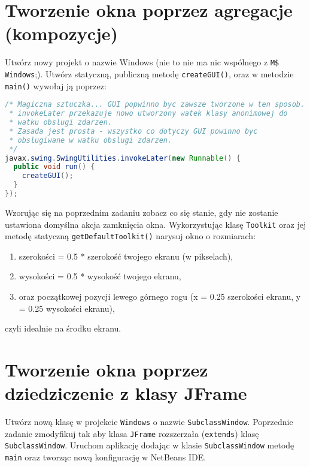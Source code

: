 \documentclass[12pt,letterpaper]{article}
\begin{document}
\section{Tworzenie okna poprzez agregacje (kompozycje)}
\label{sec:tworz-okna-agreg}

Utwórz nowy projekt o nazwie Windows (nie to nie ma nic wspólnego z \verb+M$ Windows+;).
Utwórz statyczną, publiczną metodę \verb+createGUI()+, oraz w metodzie \verb+main()+
wywołaj ją poprzez:
\begin{lstlisting}[language=Java]
/* Magiczna sztuczka... GUI popwinno byc zawsze tworzone w ten sposob.
 * invokeLater przekazuje nowo utworzony watek klasy anonimowej do 
 * watku obslugi zdarzen. 
 * Zasada jest prosta - wszystko co dotyczy GUI powinno byc
 * obslugiwane w watku obslugi zdarzen.
 */
javax.swing.SwingUtilities.invokeLater(new Runnable() {
  public void run() {
    createGUI();
  }
});
\end{lstlisting}

Wzorując się na poprzednim zadaniu zobacz co się stanie,
gdy nie zostanie ustawiona domyślna akcja zamknięcia
okna. Wykorzystując klasę \verb+Toolkit+ oraz jej metodę statyczną \verb+getDefaultToolkit()+
 narysuj okno o rozmiarach:
 \begin{enumerate}
 \item szerokości = 0.5 * szerokość twojego ekranu (w pikselach),
 \item wysokości = 0.5 * wysokość twojego ekranu,
 \item oraz początkowej pozycji lewego górnego rogu (x = 0.25 szerokości ekranu, y
   = 0.25 wysokości ekranu),
 \end{enumerate}
czyli idealnie na środku ekranu.

\section{ Tworzenie okna poprzez dziedziczenie z klasy JFrame}
\label{sec:tworz-okna-dziedzi}

Utwórz nową klasę w projekcie \verb+Windows+ o nazwie
\verb+SubclassWindow+. Poprzednie zadanie zmodyfikuj tak aby klasa
\verb+JFrame+ rozszerzała (\verb+extends+) klasę
\verb+SubclassWindow+. Uruchom aplikację dodając w klasie \verb+SubclassWindow+
metodę \verb+main+ oraz tworząc nową konfigurację w  NetBeans IDE.
\end{document}
